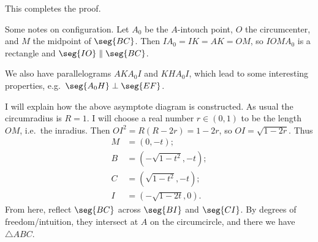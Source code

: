 This completes the proof.

\begin{remark}
    Some notes on configuration. Let $A_0$ be the $A$-intouch point, $O$ the circumcenter, and $M$ the midpoint of $\seg{BC}$. Then $IA_0=IK=AK=OM$, so $IOMA_0$ is a rectangle and $\seg{IO}\parallel\seg{BC}$.

    We also have parallelograms $AKA_0I$ and $KHA_0I$, which lead to some interesting properties, e.g.\ $\seg{A_0H}\perp\seg{EF}$.
\end{remark}
\begin{remark}
    I will explain how the above asymptote diagram is constructed. As usual the circumradius is $R=1$. I will choose a real number $r\in(0,1)$ to be the length $OM$, i.e.\ the inradius. Then $OI^2=R(R-2r)=1-2r$, so $OI=\sqrt{1-2r}$. Thus
    \begin{align*}
        M&=(0,-t);\\
        B&=\left(-\sqrt{1-t^2},-t\right);\\
        C&=\left(\sqrt{1-t^2},-t\right);\\
        I&=\left(-\sqrt{1-2t},0\right).
    \end{align*}
    From here, reflect $\seg{BC}$ across $\seg{BI}$ and $\seg{CI}$. By degrees of freedom/intuition, they intersect at $A$ on the circumcircle, and there we have $\triangle ABC$.
\end{remark}

